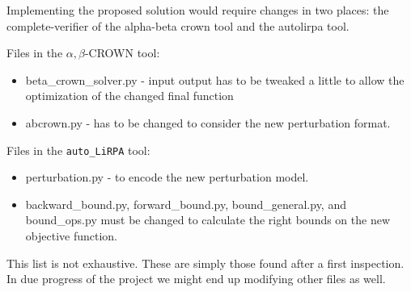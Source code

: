 \documentclass{article}
\begin{document}
Implementing the proposed solution would require changes in two places: the complete-verifier of the alpha-beta crown tool and the autolirpa tool.

Files in the $\alpha,\beta$-CROWN tool:

\begin{itemize}
    \item beta\_crown\_solver.py - input output has to be tweaked a little to allow the optimization of the changed final function
    \item abcrown.py - has to be changed to consider the new perturbation format.
\end{itemize}

Files in the \texttt{auto\_LiRPA} tool:

\begin{itemize}
    \item perturbation.py - to encode the new perturbation model.
    \item backward\_bound.py, forward\_bound.py, bound\_general.py, and bound\_ops.py must be changed to calculate the right bounds on the new objective function.
\end{itemize}

This list is not exhaustive. These are simply those found after a first inspection. In due progress of the project we might end up modifying other files as well.
\end{document}
